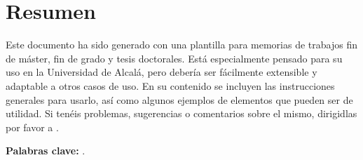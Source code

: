 %

\chapter*{Resumen}
\label{cha:resumen}


Este documento ha sido generado con una plantilla para memorias de trabajos fin de máster, fin de grado y tesis doctorales. Está especialmente pensado para su uso en la Universidad de Alcalá, pero debería ser fácilmente extensible y adaptable a otros casos de uso. En su contenido se incluyen las instrucciones generales para usarlo, así como algunos ejemplos de elementos que pueden ser de utilidad. Si tenéis problemas, sugerencias o comentarios sobre el mismo, dirigidlas por favor a \contactauthor.

\textbf{Palabras clave:} \myThesisKeywords.



